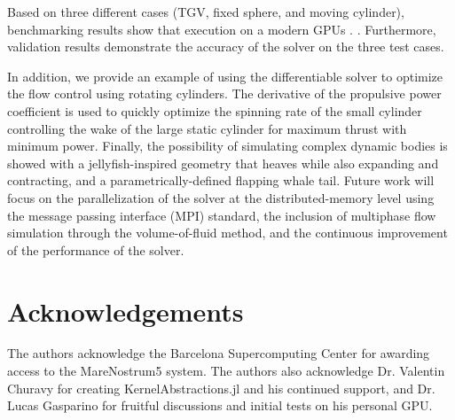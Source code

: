 \documentclass[10pt,a4paper]{article}
\begin{document}
Based on three different cases (TGV, fixed sphere, and moving cylinder), benchmarking results show that execution on a modern GPUs . . Furthermore, validation results demonstrate the accuracy of the solver on the three test cases. 

In addition, we provide an example of using the differentiable solver to optimize the flow control using rotating cylinders. The derivative of the propulsive power coefficient is used to quickly optimize the spinning rate of the small cylinder controlling the wake of the large static cylinder for maximum thrust with minimum power. Finally, the possibility of simulating complex dynamic bodies is showed with a jellyfish-inspired geometry that heaves while also expanding and contracting, and a parametrically-defined flapping whale tail. Future work will focus on the parallelization of the solver at the distributed-memory level using the message passing interface (MPI) standard, the inclusion of multiphase flow simulation through the volume-of-fluid method, and the continuous improvement of the performance of the solver.

\section{Acknowledgements}\label{sec:acknowledgements}
The authors acknowledge the Barcelona Supercomputing Center for awarding access to the MareNostrum5 system. The authors also acknowledge Dr. Valentin Churavy for creating KernelAbstractions.jl and his continued support, and Dr. Lucas Gasparino for fruitful discussions and initial tests on his personal GPU.



\end{document}
